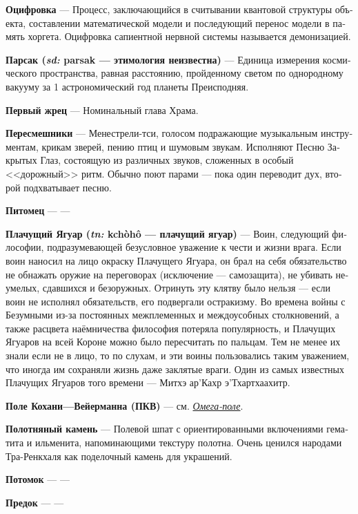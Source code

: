\documentclass[a4paper,12pt,fleqn]{book}\usepackage{polyglossia}\setdefaultlanguage[babelshorthands=true]{russian}\setotherlanguage{english}\defaultfontfeatures{Ligatures=TeX,Mapping=tex-text}\usepackage{xcolor}\newcommand{\ml}[3]{#2}
\newcommand{\theterm}[3]{\textbf{\hypertarget{#1}{#2}} --- #3}
\newcommand{\thesynonim}[3]{\textbf{#2} --- см. \textit{\hyperlink{#1}{#3}}.}
\newcommand{\theorigin}[3]{\textit{#1:} #2 --- #3}
\begin{document}
{\theterm{digitalization}
{Оцифровка}
{Процесс, заключающийся в считывании квантовой структуры объекта, составлении математической модели и последующий перенос модели в память хоргета.
Оцифровка сапиентной нервной системы называется демонизацией.}

\theterm{parsac}
{Парсак (\theorigin{sd}{parsak}{этимология неизвестна})}
{Единица измерения космического пространства, равная расстоянию, пройденному светом по однородному вакууму за 1 астрономический год планеты Преисподняя.}

\theterm{head-priest}
{Первый жрец}
{Номинальный глава Храма.}

\theterm{mockingbard}
{Пересмешники}
{Менестрели-тси, голосом подражающие музыкальным инструментам, крикам зверей, пению птиц и шумовым звукам.
Исполняют Песню Закрытых Глаз, состоящую из различных звуков, сложенных в особый <<дорожный>> ритм.
Обычно поют парами --- пока один переводит дух, второй подхватывает песню.}

\theterm{nurseling}
{Питомец}
{---}

\theterm{crying-jaguar}
{Плачущий Ягуар (\theorigin{tn}{kch\`{o}h\^{o}}{плачущий ягуар})}
{Воин, следующий философии, подразумевающей безусловное уважение к чести и жизни врага.
Если воин наносил на лицо окраску Плачущего Ягуара, он брал на себя обязательство не обнажать оружие на переговорах (исключение --- самозащита), не убивать неумелых, сдавшихся и безоружных.
Отринуть эту клятву было нельзя --- если воин не исполнял обязательств, его подвергали остракизму.
Во времена войны с Безумными из-за постоянных межплеменных и междоусобных столкновений, а также расцвета наёмничества философия потеряла популярность, и Плачущих Ягуаров на всей Короне можно было пересчитать по пальцам.
Тем не менее их знали если не в лицо, то по слухам, и эти воины пользовались таким уважением, что иногда им сохраняли жизнь даже заклятые враги.
Один из самых известных Плачущих Ягуаров того времени --- Митхэ ар’Кахр э’Тхартхаахитр.}

\thesynonim{omega-field} %
{Поле Кохани---Вейерманна (ПКВ)}
{Омега-поле}

\theterm{weavingstone}
{Полотняный камень}
{Полевой шпат с ориентированными включениями гематита и ильменита, напоминающими текстуру полотна.
Очень ценился народами Тра-Ренкхаля как поделочный камень для украшений.}

\theterm{scion}
{Потомок}
{---}

\theterm{root}
{Предок}
{---}

}
\end{document}
